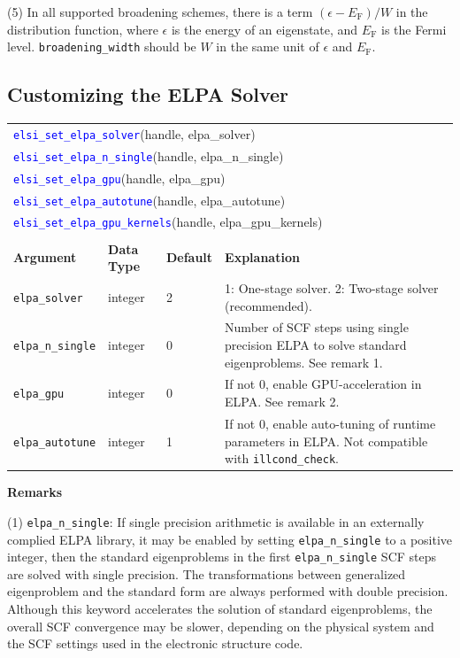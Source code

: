 \documentclass{report}
\newcommand{\api}[1]{\textcolor{blue}{\texttt{#1}}}
\begin{document}
(5) In all supported broadening schemes, there is a term $(\epsilon - E_\text{F})/W$ in the distribution function, where $\epsilon$ is the energy of an eigenstate, and $E_\text{F}$ is the Fermi level. \texttt{broadening\_width} should be $W$ in the same unit of $\epsilon$ and $E_\text{F}$.

\subsection{Customizing the ELPA Solver}
\label{subsec:setter_elpa}
\begin{tabular}[]{|p{30mm}|p{20mm}|p{15mm}|p{97mm}|}
\multicolumn{4}{l}{\api{elsi\_set\_elpa\_solver}(handle, elpa\_solver)}\\
\multicolumn{4}{l}{\api{elsi\_set\_elpa\_n\_single}(handle, elpa\_n\_single)}\\
\multicolumn{4}{l}{\api{elsi\_set\_elpa\_gpu}(handle, elpa\_gpu)}\\
\multicolumn{4}{l}{\api{elsi\_set\_elpa\_autotune}(handle, elpa\_autotune)}\\
\multicolumn{4}{l}{\api{elsi\_set\_elpa\_gpu\_kernels}(handle, elpa\_gpu\_kernels)}\\
\multicolumn{4}{l}{}\\
\hline
\multicolumn{1}{|l|}{\textbf{Argument}} & \multicolumn{1}{l|}{\textbf{Data Type}} & \multicolumn{1}{l|}{\textbf{Default}} & \multicolumn{1}{l|}{\textbf{Explanation}}\\
\hline
\texttt{elpa\_solver}       & integer & 2 & 1: One-stage solver. 2: Two-stage solver (recommended).\\
\hline
\texttt{elpa\_n\_single}    & integer & 0 & Number of SCF steps using single precision ELPA to solve standard eigenproblems. See remark 1.\\
\hline
\texttt{elpa\_gpu}          & integer & 0 & If not 0, enable GPU-acceleration in ELPA. See remark 2.\\
\hline
\texttt{elpa\_autotune}     & integer & 1 & If not 0, enable auto-tuning of runtime parameters in ELPA. Not compatible with \texttt{illcond\_check}.\\
\hline
\end{tabular}

\textbf{Remarks}

(1) \texttt{elpa\_n\_single}: If single precision arithmetic is available in an externally complied ELPA library, it may be enabled by setting \texttt{elpa\_n\_single} to a positive integer, then the standard eigenproblems in the first \texttt{elpa\_n\_single} SCF steps are solved with single precision. The transformations between generalized eigenproblem and the standard form are always performed with double precision. Although this keyword accelerates the solution of standard eigenproblems, the overall SCF convergence may be slower, depending on the physical system and the SCF settings used in the electronic structure code.
\end{document}
